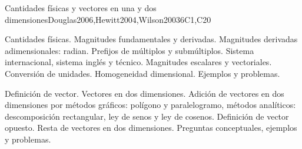 \begin{syllabus}
\begin{outcomes}
\item {}
\item {}
\end{outcomes}

\begin{competences}
    \item {}
\end{competences}

\begin{unit}{Cantidades físicas y vectores en una y dos dimensiones}{}{Douglas2006,Hewitt2004,Wilson2003}{6}{C1,C20}
\begin{topics}
      \item Cantidades físicas. Magnitudes fundamentales y derivadas. Magnitudes derivadas adimensionales: radian. Prefijos de múltiplos y submúltiplos. Sistema internacional, sistema inglés y técnico. Magnitudes escalares y vectoriales. Conversión de unidades. Homogeneidad dimensional. Ejemplos y problemas.
      \item Definición de vector. Vectores en dos dimensiones. Adición de vectores en dos dimensiones por métodos gráficos: polígono y paralelogramo, métodos analíticos: descomposición rectangular, ley de senos y ley de cosenos. Definición de vector opuesto. Resta de vectores en dos dimensiones. Preguntas conceptuales, ejemplos y problemas.
   \end{topics}

\end{unit}


\end{syllabus}
